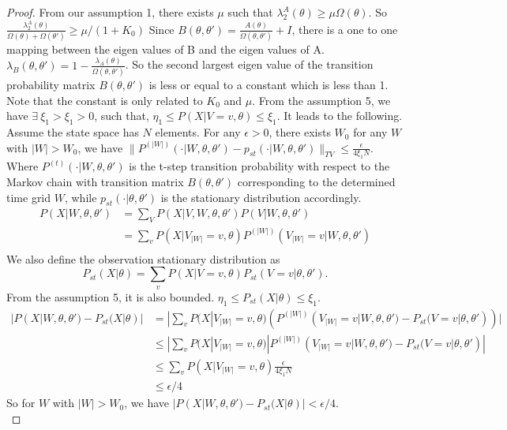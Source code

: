 \begin{proof}
From our assumption 1, there exists $\mu$ such that $\lambda^A_2(\theta) \geq \mu \Omega(\theta)$. So $\frac{\lambda^A_2(\theta)}{\Omega(\theta) + \Omega(\theta')} \geq \mu / (1 + K_0) $ Since $B(\theta, \theta') = \frac{A(\theta)}{\Omega(\theta, \theta')} + I $, there is a one to one mapping between the eigen values of B and the eigen values of A. $\lambda_B(\theta, \theta') = 1 - \frac{\lambda_A(\theta)}{\Omega(\theta, \theta')}$. So the second largest eigen value of the transition probability matrix $B(\theta, \theta')$ is less or equal to a constant which is less than 1. Note that the constant is only related to $K_0$ and $\mu$. From the assumption 5, we have $\exists \ \xi_1 > \xi_1 > 0$, such that, $ \eta_1 \leq P(X | V=v, \theta) \leq \xi_1$. It leads to the following. Assume the state space has $N$ elements. For any $\epsilon > 0$, there exists $W_0$ for any $W$ with $|W| > W_0$, we have $\parallel P^{(|W|)}(\cdot | W, \theta, \theta') - p_{st}(\cdot | W, \theta, \theta')\parallel_{TV} \leq \frac{\epsilon}{4\xi_1N} $. Where $P^{(t)}(\cdot | W, \theta, \theta' )$
 is the t-step transition probability with respect to the Markov chain with transition matrix $B(\theta, \theta')$ corresponding to the determined time grid $W$, while $p_{st}(\cdot | \theta, \theta')$ is the stationary distribution accordingly.
\begin{align*}
P(X|W , \theta, \theta') &= \sum_V P(X | V, W, \theta, \theta') P(V | W, \theta, \theta')\\
&= \sum_{v} P(X | V_{|W|}=v, \theta) P^{(|W|)}(V_{|W|}=v | W, \theta, \theta')\\
\end{align*}
 We also define the observation stationary distribution as $$P_{st}(X | \theta) = \sum_{v} P(X | V=v, \theta) P_{st}(V=v | \theta, \theta').$$
 From the assumption 5, it is also bounded. $\eta_1 \leq P_{st}(X | \theta) \leq \xi_1$.
\begin{align*}
|P(X|W , \theta, \theta') - P_{st}(X | \theta)| &= | \sum_{v} P(X | V_{|W|}=v, \theta)(P^{(|W|)}(V_{|W|}=v | W, \theta, \theta') -  P_{st}(V=v | \theta, \theta'))|\\
& \leq |\sum_{v} P(X | V_{|W|}=v, \theta)|P^{(|W|)}(V_{|W|}=v | W, \theta, \theta') -  P_{st}(V=v | \theta, \theta')|\\
& \leq \sum_{v} P(X | V_{|W|}=v, \theta)\frac{\epsilon}{4\xi_1N}\\
& \leq \epsilon / 4
\end{align*}
So for $W$ with $|W| > W_0$, we have  $|P(X| W, \theta, \theta') - P_{st}(X | \theta)| < \epsilon / 4$. \\

\end{proof}
